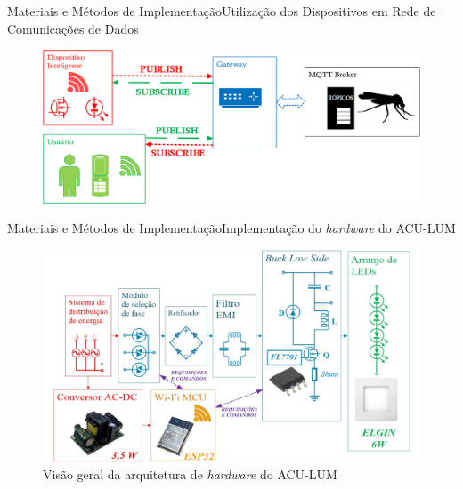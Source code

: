 \begin{frame}{Materiais e Métodos de Implementação}{Utilização dos Dispositivos em Rede de Comunicações de Dados}

\begin{block}
\small{}
\end{block}
	
\begin{figure}[htp]
	\centering
	\caption{ }
	\includegraphics[width=0.9\linewidth]{img/mqtt.png}
    \hspace{1cm}
\end{figure}
\end{frame}

\begin{frame}{Materiais e Métodos de Implementação}{Implementação do \textit{hardware} do ACU-LUM}
\vspace{-0.64cm}
\begin{figure}[htp]
	\centering
	\caption{ \centering\small{{Visão geral da arquitetura de \textit{hardware} do ACU-LUM}}}
	\includegraphics[width=0.98\linewidth]{img/aplum.jpg}
    \hspace{1cm}
    \vspace{3cm}
\end{figure}
\end{frame}



